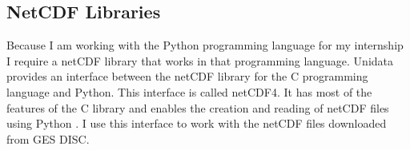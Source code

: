 \documentclass[../00_main.tex]{subfiles}
\begin{document}
\subsection{NetCDF Libraries}

Because I am working with the Python programming language for my internship
I require a netCDF library that works in that programming language. Unidata
provides an interface between the netCDF library for the C programming language
and Python. This interface is called netCDF4. It has most of the features of
the C library and enables the creation and reading of netCDF files using
Python \cite{netcdf4}. I use this interface to work with the netCDF files 
downloaded from GES DISC.
\end{document}
